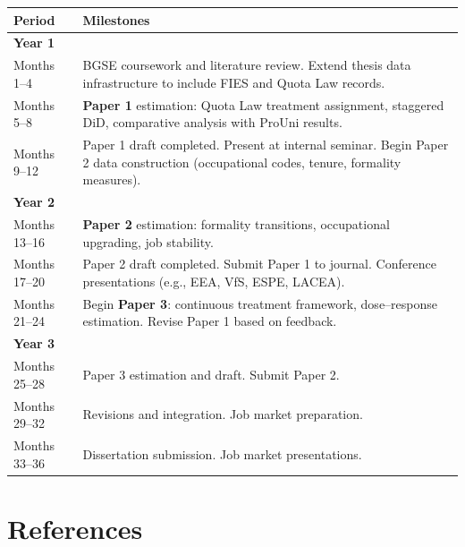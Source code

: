 \documentclass[a4paper,11pt]{article}
\begin{document}
\begin{table}[h]
\centering
\small
\begin{tabular}{@{}lp{10.5cm}@{}}
\toprule
\textbf{Period} & \textbf{Milestones} \\
\midrule
\textbf{Year 1} & \\
Months 1--4 & BGSE coursework and literature review. Extend thesis data infrastructure to include FIES and Quota Law records. \\
Months 5--8 & \textbf{Paper 1} estimation: Quota Law treatment assignment, staggered DiD, comparative analysis with ProUni results. \\
Months 9--12 & Paper 1 draft completed. Present at internal seminar. Begin Paper 2 data construction (occupational codes, tenure, formality measures). \\[4pt]
\textbf{Year 2} & \\
Months 13--16 & \textbf{Paper 2} estimation: formality transitions, occupational upgrading, job stability. \\
Months 17--20 & Paper 2 draft completed. Submit Paper 1 to journal. Conference presentations (e.g., EEA, VfS, ESPE, LACEA). \\
Months 21--24 & Begin \textbf{Paper 3}: continuous treatment framework, dose--response estimation. Revise Paper 1 based on feedback. \\[4pt]
\textbf{Year 3} & \\
Months 25--28 & Paper 3 estimation and draft. Submit Paper 2. \\
Months 29--32 & Revisions and integration. Job market preparation. \\
Months 33--36 & Dissertation submission. Job market presentations. \\
\bottomrule
\end{tabular}
\end{table}

\section{References}
\end{document}

